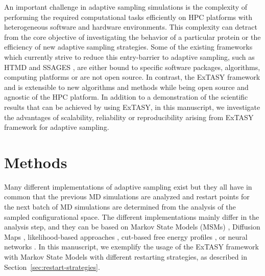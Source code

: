 An important challenge in adaptive sampling simulations is the complexity of
performing the required computational tasks efficiently on HPC platforms with
heterogeneous software and hardware environments. This complexity can detract
from the core objective of investigating the behavior of a particular protein
or the efficiency of new adaptive sampling strategies. Some of the existing
frameworks which currently strive to reduce this entry-barrier to
adaptive sampling, such as HTMD\cite{doerr2016htmd} and SSAGES \cite{SSAGES},
are either bound to specific software packages, algorithms, computing
platforms or are not open source.  In contrast, the ExTASY\cite{Extasy2016}
framework  and is extensible to new algorithms and methods while being open source and agnostic of the HPC platform. In addition to a demonstration of the
scientific results that can be achieved by using ExTASY, in this manuscript, we
investigate the advantages of scalability, reliability or reproducibility
arising from ExTASY framework for adaptive sampling.


\section{\label{sec:methods}Methods}

Many different implementations of adaptive sampling exist but they all 
have in common
that the previous MD simulations are analyzed and restart points for the next
batch of MD simulations are determined from the analysis of the sampled configurational space.
The different implementations mainly differ in the analysis step, and
they can be based on Markov State Models (MSMs) \cite{prinz2011markov,
MSM-Pande-2018,bookmsm,masterequationsMSM,SCHUTTE1999146}, Diffusion Maps
\cite{Coifman7426, rohrdanz2011determination,Zheng2011, Boninsegna2015},
likelihood-based approaches \cite{peters2006obtaining}, cut-based free energy
profiles \cite{krivov2008diffusive}, or neural networks
\cite{Mardt2018,wehmeyer2018time, ribeiro2018reweighted}. 
In this manuscript, we exemplify the
usage of the ExTASY framework with Markov State Models with different restarting
strategies, as described in Section~\ref{sec:restart-strategies}.

